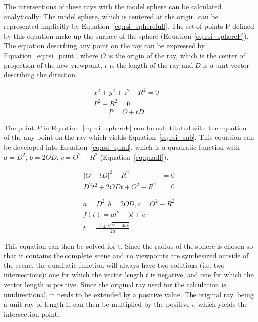 The intersections of these rays with the model sphere can be calculated analytically: The model sphere, which is centered at the origin, can be represented implicitly by Equation~\ref{eq:rsi_spherefull}. The set of points P defined by this equation make up the surface of the sphere (Equation~\ref{eq:rsi_sphereP}). 
The equation describing any point on the ray can be expressed by Equation~\ref{eq:rsi_point}, where $O$ is the origin of the ray, which is the center of projection of the new viewpoint, $t$ is the length of the ray and $D$ is a unit vector describing the direction. 

\begin{align}
  x^2 + y^2 + z^2 - R^2 = 0&\label{eq:rsi_spherefull}\\ 
  P^2 - R^2 = 0&\label{eq:rsi_sphereP}
\end{align} 
\begin{align}
  P = O + tD& \label{eq:rsi_point}
\end{align} 

The point $P$ in Equation~\ref{eq:rsi_sphereP} can be substituted with the equation of the any point on the ray which yields Equation~\ref{eq:rsi_sub}. This equation can be developed into Equation~\ref{eq:rsi_quad}, which is a quadratic function with $a = D^2$, $b = 2OD$, $c = O^2-R^2$ (Equation~\ref{eq:quadf}).

\begin{align}
  |O + tD|^2 - R^2 &= 0  \label{eq:rsi_sub}\\
  D^2 t^2 + 2ODt + O^2 - R^2 &= 0 \label{eq:rsi_quad}
\end{align}

\begin{align}
  a = D^2, b = 2OD, c = O^2-R^2 \\
  f(t) = at^2 + bt + c \label{eq:quadf}\\
  t = \frac{-b \pm \sqrt{b^2 - 4ac}}{2a} \label{eq:solvequadf}
\end{align}

This equation can then be solved for t. Since the radius of the sphere is chosen so that it contains the complete scene and no viewpoints are synthesized outside of the scene, the quadratic function will always have two solutions (i.e. two intersections): one for which the vector length $t$ is negative, and one for which the vector length is positive. Since the original ray used for the calculation is unidirectional, it needs to be extended by a positive value. The original ray, being a unit ray of length 1, can then be multiplied by the positive $t$, which yields the intersection point. 

